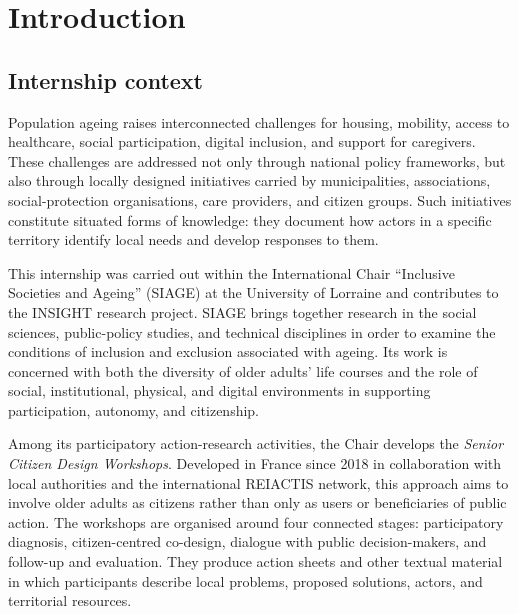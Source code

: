 \documentclass[
11pt,
english,
singlespacing,
headsepline,
]{MastersDoctoralThesis}
\begin{document}



\mainmatter

\pagestyle{thesis}

\chapter{Introduction}

\section{Internship context}

Population ageing raises interconnected challenges for housing, mobility, access
to healthcare, social participation, digital inclusion, and support for caregivers.
These challenges are addressed not only through national policy frameworks, but
also through locally designed initiatives carried by municipalities, associations,
social-protection organisations, care providers, and citizen groups. Such
initiatives constitute situated forms of knowledge: they document how actors in a
specific territory identify local needs and develop responses to them.

This internship was carried out within the International Chair ``Inclusive
Societies and Ageing'' (SIAGE) at the University of Lorraine and contributes to
the INSIGHT research project. SIAGE brings together research in the social
sciences, public-policy studies, and technical disciplines in order to examine the
conditions of inclusion and exclusion associated with ageing. Its work is concerned
with both the diversity of older adults' life courses and the role of social,
institutional, physical, and digital environments in supporting participation,
autonomy, and citizenship.

Among its participatory action-research activities, the Chair develops the
\textit{Senior Citizen Design Workshops}. Developed in France since 2018 in
collaboration with local authorities and the international REIACTIS network, this
approach aims to involve older adults as citizens rather than only as users or
beneficiaries of public action. The workshops are organised around four connected
stages: participatory diagnosis, citizen-centred co-design, dialogue with public
decision-makers, and follow-up and evaluation. They produce action sheets and
other textual material in which participants describe local problems, proposed
solutions, actors, and territorial resources.
\end{document}
